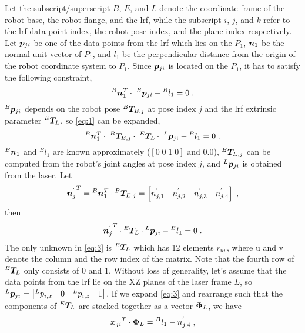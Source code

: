 Let the subscript/superscript $B$, $E$, and $L$ denote the coordinate frame of the robot base, the robot flange, and the \ac{lrf}, while the subscript $i$, $j$, and $k$ refer to the \ac{lrf} data point index, the robot pose index, and the plane index respectively. Let $\vb*{p}_{ji}$ be one of the data points from the \ac{lrf} which lies on the $P_1$, $\vb*{n}_1$ be the normal unit vector of $P_1$, and $l_1$ be the perpendicular distance from the origin of the robot coordinate system to $P_1$.  Since $\vb*{p}_{ji}$ is located on the $P_1$, it has to satisfy the following constraint, 
  \begin{equation}
  \label{eq:1}
  {^B}\vb*{n}_1 ^T \cdot\; {^B}\vb*{p}_{ji}  - {^B}l_1 = 0 \; .
   \end{equation}
${^B}\vb*{p}_{ji}$ depends on the robot pose ${^B}\vb*{T}_{E,j}$ at pose index $j$ and the \ac{lrf} extrinsic parameter ${^E}\vb*{T}_L$, so \eqref{eq:1}  can be expanded,
  \begin{equation}
  {{^B}\vb*{n}_1 ^{T}} \cdot\; {^B}\vb*{T}_{E,j} \cdot \; {^E}\vb*{T}_L \cdot \; {^L}\vb*{p}_{ji}  - {^B}l_1 = 0 \; .
  \end{equation}
${^B}\vb*{n}_1$ and $^{B}l_1$ are known approximately ($[0 \; 0\; 1\;0]$ and $0.0$), ${^B}\vb*{T}_{E,j}$ can be computed from the robot's joint angles at pose index $j$, and ${^L}\vb*{p}_{ji}$ is obtained from the laser. Let 
\begin{equation}
{\vb*{n}_j^{'}}^{T} = {^B}\vb*{n}_1 ^T \cdot {^B}\vb*{T}_{E,j} = 
\left[n^{'}_{j,1} \quad n^{'}_{j,2} \quad n^{'}_{j,3}  \quad n^{'}_{j,4} \right] \; , 
\end{equation}
then  
  \begin{equation}
  \label{eq:3}
  {\vb*{n}_j^{'}} ^T \cdot {^E}\vb*{T}_L \cdot {^L}\vb*{p}_{ji} - {^B}l_1 = 0 \; .
  \end{equation}
The only unknown in \eqref{eq:3} is ${^E}\vb*{T}_L$ which has 12 elements $r_{uv}$, where u and v denote the column and the row index of the matrix. Note that the fourth row of ${^E}\vb*{T}_L$ only consists of 0 and 1. 
Without loss of generality, let's assume that the data points from the \ac{lrf} lie on the XZ planes of the laser frame $L$, so ${^L}\vb*{p}_{ji} = \left[{^L}p_{i,x} \quad 0 \quad {^L}p_{i,z}\quad 1\right]$. If we expand \eqref{eq:3} and rearrange such that the components of ${^E}\vb*{T}_L$ are stacked together as a vector $\vb*{\Phi}_L$, we have
\begin{equation}
\label{eq:4}
  {\vb*{x}_{ji}}^T \cdot \vb*{\Phi}_L = {^B}l_1 -  n^{'}_{j,4} \; , 
\end{equation}
